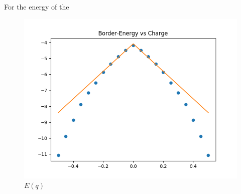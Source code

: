 For the energy of the 

\begin{figure}
	\centering
	\includegraphics[width = 12cm]{Images/Hydrogen/hydrogen_border_energy}
	\caption{$E(q)$}
	\label{image_hydrogen_charge_potential}
\end{figure}
